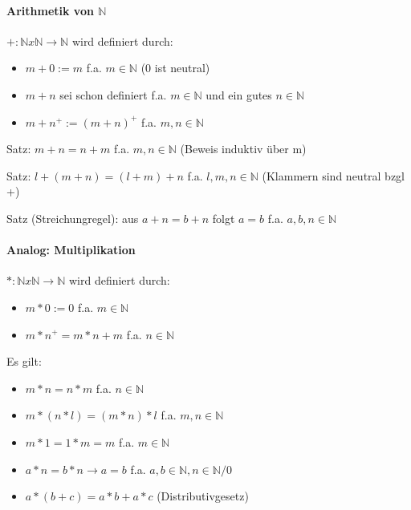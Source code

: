 \documentclass[a4paper]{article}
\begin{document}
\begin{multicols}{3}
    \paragraph{Arithmetik von $\mathbb{N}$}
    $+: \mathbb{N} x \mathbb{N} \rightarrow \mathbb{N}$ wird definiert durch:
    \begin{itemize}
        \item $m+0:=m$ f.a. $m\in \mathbb{N}$ (0 ist neutral)
        \item $m+n$ sei schon definiert f.a. $m\in \mathbb{N}$ und ein gutes $n\in \mathbb{N}$
        \item $m+n^+:=(m+n)^+$ f.a. $m,n \in \mathbb{N}$
    \end{itemize}
    
    Satz: $m+n=n+m$ f.a. $m,n\in\mathbb{N}$ (Beweis induktiv über m)
    
    Satz: $l+(m+n)=(l+m)+n$ f.a. $l,m,n\in\mathbb{N}$ (Klammern sind neutral bzgl +)
    
    Satz (Streichungregel): aus $a+n=b+n$ folgt $a=b$ f.a. $a,b,n\in\mathbb{N}$
    
    \paragraph{Analog: Multiplikation}
    $*: \mathbb{N} x \mathbb{N} \rightarrow \mathbb{N}$ wird definiert durch:
    \begin{itemize}
        \item $m*0:=0$ f.a. $m\in \mathbb{N}$
        \item $m*n^+=m*n+m$ f.a. $n\in\mathbb{N}$
    \end{itemize}
    Es gilt:
    \begin{itemize}
        \item $m*n=n*m$ f.a. $n\in\mathbb{N}$
        \item $m*(n*l)=(m*n)*l$ f.a. $m,n\in\mathbb{N}$
        \item $m*1 = 1*m =m$ f.a. $m\in\mathbb{N}$
        \item $a*n=b*n \rightarrow a=b$ f.a. $a,b\in\mathbb{N}, n\in\mathbb{N}/{0}$
        \item $a*(b+c)=a*b+a*c$ (Distributivgesetz)
    \end{itemize}
    

\end{multicols}
\end{document}
